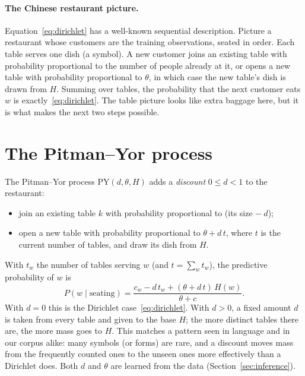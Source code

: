 \documentclass[11pt]{article}
\newcommand{\PY}{\mathrm{PY}}
\begin{document}
\paragraph{The Chinese restaurant picture.} Equation~\eqref{eq:dirichlet} has a well-known sequential
description. Picture a restaurant whose customers are the training observations, seated in order. Each
table serves one dish (a symbol). A new customer joins an existing table with probability proportional
to the number of people already at it, or opens a new table with probability proportional to $\theta$,
in which case the new table's dish is drawn from $H$. Summing over tables, the probability that the next
customer eats $w$ is exactly~\eqref{eq:dirichlet}. The table picture looks like extra baggage here, but
it is what makes the next two steps possible.

\section{The Pitman--Yor process}\label{sec:py}

The Pitman--Yor process $\PY(d, \theta, H)$ adds a \emph{discount} $0 \le d < 1$ to the restaurant:
\begin{itemize}
  \item join an existing table $k$ with probability proportional to (its size $-\ d$);
  \item open a new table with probability proportional to $\theta + d\,t$, where $t$ is the current
  number of tables, and draw its dish from $H$.
\end{itemize}
With $t_w$ the number of tables serving $w$ (and $t = \sum_w t_w$), the predictive probability of $w$ is
\begin{equation}\label{eq:py}
  P(w \mid \text{seating}) = \frac{c_w - d\,t_w + (\theta + d\,t)\, H(w)}{\theta + c}.
\end{equation}
With $d=0$ this is the Dirichlet case~\eqref{eq:dirichlet}. With $d>0$, a fixed amount $d$ is taken from
every table and given to the base $H$; the more distinct tables there are, the more mass goes to $H$.
This matches a pattern seen in language and in our corpus alike: many symbols (or forms) are rare, and
a discount moves mass from the frequently counted ones to the unseen ones more effectively than a
Dirichlet does. Both $d$ and $\theta$ are learned from the data (Section~\ref{sec:inference}).

\end{document}
